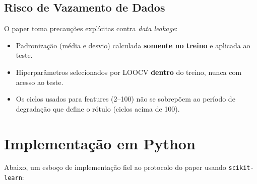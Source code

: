 \documentclass[12pt,a4paper]{article}
\begin{document}
\subsection{Risco de Vazamento de Dados}

O paper toma precau\c{c}\~oes expl\'{i}citas contra \textit{data leakage}:
\begin{itemize}
  \item Padroniza\c{c}\~ao (m\'{e}dia e desvio) calculada \textbf{somente no treino}
    e aplicada ao teste.
  \item Hiperpar\^{a}metros selecionados por LOOCV \textbf{dentro} do treino,
    nunca com acesso ao teste.
  \item Os ciclos usados para features (2--100) n\~ao se sobrep\~oem ao per\'{i}odo
    de degrada\c{c}\~ao que define o r\'{o}tulo (ciclos acima de 100).
\end{itemize}

\section{Implementa\c{c}\~ao em Python}

Abaixo, um esbo\c{c}o de implementa\c{c}\~ao fiel ao protocolo do paper usando
\texttt{scikit-learn}:
\end{document}
